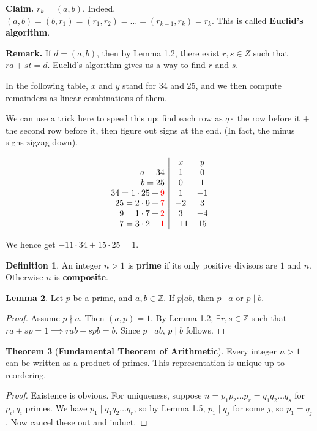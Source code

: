 \documentclass{article}
\theoremstyle{definition}
\newtheorem{theorem}{Theorem}[section]
\newtheorem{lemma}[theorem]{Lemma}
\newtheorem{defn}[theorem]{Definition}
\theoremstyle{remark}
\begin{document}
\textbf{Claim.} 
    $r_k = (a,b)$.
Indeed, $(a,b) = (b, r_1) = (r_1, r_2) = \ldots = (r_{k-1}, r_k) = r_k$. This is called \textbf{Euclid's algorithm}.

\textbf{Remark.} If $d = (a,b)$, then by Lemma 1.2, there exist $r,s \in Z$ such that $ra + st = d$. Euclid's algorithm gives us a way to find $r$ and $s$.

\vspace{3mm}


In the following table, $x$ and $y$ stand for 34 and 25, and we then compute remainders as linear combinations of them.

We can use a trick here to speed this up: find each row as $q \cdot$ the row before it + the second row before it, then figure out signs at the end. (In fact, the minus signs zigzag down).

\begin{equation*}
    \begin{array}{r|cc}
        & x & y \\
        a=34 & 1 & 0 \\
        b=25 & 0 & 1 \\
        34 = 1 \cdot 25 + \color{red}{9}& 1 & -1 \\
        25 = 2 \cdot 9 + \color{red}{7}& -2 & 3 \\
        9 = 1 \cdot 7 + \color{red}{2}& 3 & -4 \\
        7 = 3 \cdot 2 + \color{red}{1}& -11 & 15 \\
    \end{array}
\end{equation*}

We hence get $-11 \cdot 34 + 15 \cdot 25 = 1$.

\begin{defn}
    An integer $n>1$ is \textbf{prime} if its only positive divisors are $1$ and $n$. Otherwise $n$ is \textbf{composite}.
\end{defn}
\begin{lemma} %
    Let $p$ be a prime, and $a,b \in \mathbb{Z}$. If $p | ab$, then $p \mid a$ or $p \mid b$.
\end{lemma}
\begin{proof}
    Assume $p \nmid a$. Then $(a,p) = 1$. By Lemma 1.2, $\exists r,s \in \mathbb{Z}$ such that $ra + sp = 1 \implies rab + spb = b$. Since $p \mid ab$, $p \mid b$ follows.
\end{proof}

\begin{theorem}[\textbf{Fundamental Theorem of Arithmetic}] 
    Every integer ${n>1}$ can be written as a product of primes. This representation is unique up to reordering.
\end{theorem}
\begin{proof}
    Existence is obvious. For uniqueness, suppose $n = p_1p_2 \ldots p_r = q_1 q_2 \ldots q_s$ for $p_i, q_i$ primes. We have $p_1 \mid q_1 q_2 \ldots q_r$, so by Lemma 1.5, $p_1 \mid q_j$ for some $j$, so $p_1 = q_j$. Now cancel these out and induct.
\end{proof}
\end{document}
